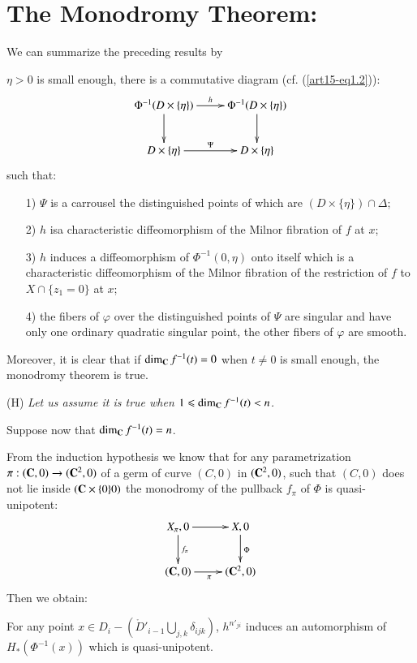 \section{The Monodromy Theorem:}\label{art15-sec3}
We can summarize the preceding results by 

\begin{thm}\label{art15-thm3.1}
$\eta > 0$ is small enough, there is a commutative diagram (cf. (\ref{art15-eq1.2})):
\[
\xymatrix{
\Phi^{-1} (D \times \{\eta\}) \ar[r]^{h} \ar[d] & \Phi^{-1} (D \times \{\eta\}) \ar[d]\\
D \times \{\eta\} \ar[r]^{\Psi} & D \times \{\eta\} 
}
\]
such that:
\begin{itemize}
\item[1)] $\Psi$ is a carrousel the distinguished points of which are $(D \times \{\eta\}) \cap \Delta$;

\item[2)] $h$ is\pageoriginale a characteristic diffeomorphism of the Milnor fibration of $f$ at $x$;

\item[3)] $h$ induces a diffeomorphism of $\Phi^{-1}(0,\eta)$ onto itself which is a characteristic diffeomorphism of the Milnor fibration of the restriction of $f$ to $X \cap \{z_1 = 0 \} $ at $x$;

\item[4)] the fibers of $\varphi$ over the distinguished points of $\Psi$ are singular and have only one ordinary quadratic singular point, the other fibers of $\varphi$ are smooth.
\end{itemize}
\end{thm}

Moreover, it is clear that if $\dim_{\mathbf{C}} f^{-1} (t) =0$ when $t \neq 0$ is small enough, the monodromy theorem is true.

(H) {\em Let us assume it is true when $1 \leqslant \dim_{\mathbf{C}} f^{-1} (t) < n$.}

Suppose now that $\dim_{\mathbf{C}} f^{-1} (t) =n$.

From the induction hypothesis we know that for any parametrization $\pi: (\mathbf{C},0)  \to (\mathbf{C}^2, 0)$ of a germ of curve $(C,0)$ in $(\mathbf{C}^2,0)$, such that $(C,0)$ does not lie inside $(\mathbf{C} \times \{0\} 0)$ the monodromy of the pullback $f_\pi$ of $\Phi$ is quasi-unipotent:
\[
\xymatrix{
X_\pi, 0 \ar[r]\ar[d]^{f_\pi} & X,0\ar[d]^{\Phi} \\
(\bfC, 0) \ar[r]_\pi & (\bfC^2 , 0)
}
\]
Then we obtain:

\begin{lemma}\label{art15-lem3.2}
For any point $x \in D_i - (\mathring{D}'_{i-1} \bigcup\limits_{j,k} \delta_{ijk})$, $h^{n'_{ji}}$ induces an automorphism of $H_* (\Phi^{-1} (x))$ which is quasi-unipotent.
\end{lemma}

